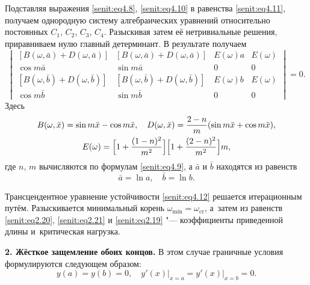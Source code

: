 Подставляя выражения \eqref{senit:eq4.8}, \eqref{senit:eq4.10} в равенства \eqref{senit:eq4.11}, получаем однородную
систему алгебраических уравнений относительно постоянных $C_1$, $C_2$, $C_3$, $C_4$. 
Разыскивая затем её нетривиальные решения, приравниваем нулю главный
детерминант. В результате получаем
\begin{equation}
\label{senit:eq4.12}
\begin{vmatrix}
\left[B (\omega,\bar{a}) + D (\omega,\bar{a}) \right] &  \left[B(\omega,\bar{a})+D(\omega,\bar{a}) \right] & E(\omega )a& E(\omega ) \\
\cos m\bar{a} & \sin m\bar{a} & 0 & 0  \\
\left[ B (\omega , \bar{b} ) + D (\omega, \bar{b}) \right] &  \left[ B (\omega,\bar{b})+ D (\omega,\bar{b})\right] & E( \omega )b & E (\omega) \\
\cos m\bar{b} & \sin m\bar{b} & 0  & 0 
\end{vmatrix}=0.
\end{equation}
Здесь
\begin{gather}
\label{senit:eq4.13}
B(\omega ,\bar {x})=\sin m\bar{x} -\cos
m \bar{x}, \quad   D(\omega ,\bar x )=\frac{2-n}{m}(\sin m\bar x +\cos
m\bar {x}), \\
 E(\omega )=\Bigl[1+\frac{(1-n)^2}{m^2}\Bigr]\Bigl[1+\frac{(2-n)^2}{m^2}\Bigr]m,
\end{gather}
где $n$, $m$ вычисляются по формулам \eqref{senit:eq4.9}, а $\bar  {a} $ и $\bar
 {b} $ находятся из равенств
\begin{equation}
\label{senit:eq4.14}
\bar a =\ln a, \quad \bar b =\ln b.
\end{equation}

Трансцендентное уравнение устойчивости \eqref{senit:eq4.12} решается итерационным путём.
Разыскивается минимальный корень $\omega_{\min}=\omega_{\text{cr}}$, а~затем из равенств \eqref{senit:eq2.20}, \eqref{senit:eq2.21} и \eqref{senit:eq2.19} "--- коэффициенты приведенной длины и~критическая нагрузка.

\smallskip

\textbf{2. Жёсткое защемление обоих концов.}
В этом случае граничные условия формулируются следующем образом:
\begin{equation}
\label{senit:eq4.15}
y(a)=y(b)= 0, \quad  y'(x)\big|_{x=a} = y'(x)\big|_{x=b} =0.
\end{equation}

